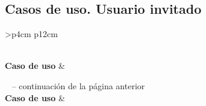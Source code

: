 \subsection{Casos de uso. Usuario invitado}
\begin{longtable}{
>{}p{4cm}
p{12cm}
}
\caption{Caso de Uso: Registro} \label{table:usecase} \\
\toprule
{}
\textbf{Caso de uso} &  \\
\endfirsthead

%
{{ \tablename\ \thetable{} -- continuación de la página anterior}} \\
\toprule
{}
\textbf{Caso de uso} &  \\
\midrule
\endhead

\midrule
{} \\ 
\endfoot

\bottomrule
\endlastfoot


\end{longtable}
